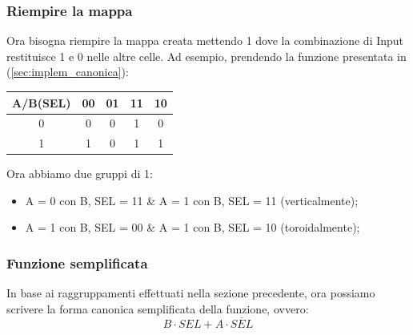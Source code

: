 \documentclass[12pt]{article}
\begin{document}
\subsubsection{Riempire la mappa}
Ora bisogna riempire la mappa creata mettendo 1 dove la combinazione di Input restituisce 1 e 0 nelle altre celle.
Ad esempio, prendendo la funzione presentata in (\ref{sec:implem_canonica}):
\begin{center}
    \begin{tabular}{|| c | c c c c ||}
        \hline
        A/B(SEL) & 00 & 01 & 11 & 10 \\
        \hline
        0 & 0 & 0 & 1 & 0 \\
        \hline
        1 & 1 & 0 & 1 & 1 \\
        \hline
    \end{tabular}
\end{center}
Ora abbiamo due gruppi di 1:
\begin{itemize}
    \item A = 0 con B, SEL = 11 \& A = 1 con B, SEL = 11 (verticalmente);
    \item A = 1 con B, SEL = 00 \& A = 1 con B, SEL = 10 (toroidalmente);
\end{itemize}
\subsubsection{Funzione semplificata}
In base ai raggruppamenti effettuati nella sezione precedente, ora possiamo scrivere la forma canonica semplificata della funzione, ovvero:
\[
    B \cdot SEL + A \cdot \overline{SEL}
\]
\pagebreak
\end{document}

